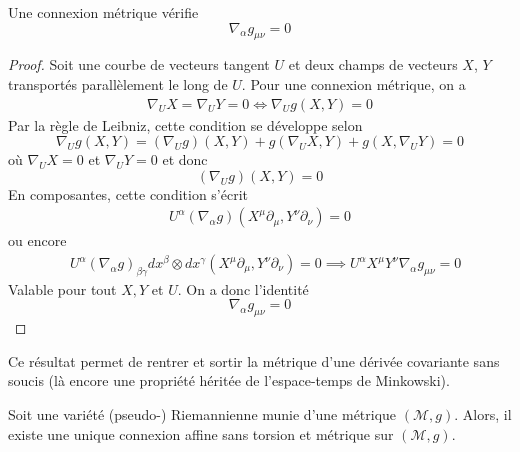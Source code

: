 \begin{theoremframe}
    \begin{lemme}
        Une connexion métrique vérifie
        \begin{equation}
        \label{eq:métrique métrique}
            \nabla_\alpha g_{\mu\nu} = 0
        \end{equation}
    \end{lemme}
\end{theoremframe}
\begin{proof}
    Soit une courbe de vecteurs tangent $U$ et deux champs de vecteurs $X$, $Y$ transportés parallèlement le long de $U$. Pour une connexion métrique, on a
    \begin{align}
        \nabla_U X = \nabla_U Y = 0 \iff \nabla_U g(X,Y) = 0
    \end{align}
    Par la règle de Leibniz, cette condition se développe selon
    \begin{equation}
        \nabla_U g(X, Y) = (\nabla_U g)(X, Y) + g(\nabla_U X, Y) + g(X, \nabla_U Y) = 0
    \end{equation}
    où $\nabla_U X = 0$ et $\nabla_U Y = 0$ et donc
    \begin{equation}
         (\nabla_U g)(X, Y) =0
    \end{equation}
    En composantes, cette condition s'écrit
    \begin{align}
        U^{\alpha}(\nabla_{\alpha}g)(X^{\mu}\partial_{\mu}, Y^{\nu}\partial_{\nu}) = 0
        \label{conexion métrique 1}
    \end{align}
    ou encore
    \begin{align}
        &U^{\alpha}(\nabla_{\alpha}g)_{\beta \gamma} dx^{\beta}\otimes dx^{\gamma}(X^{\mu}\partial_{\mu}, Y^{\nu}\partial_{\nu}) = 0 \implies U^{\alpha}X^{\mu}Y^{\nu}\nabla_{\alpha}g_{\mu \nu} =0
    \end{align}
    Valable pour tout $X,Y$ et $U$. On a donc l'identité
    \begin{equation}
    \nabla_{\alpha}g_{\mu \nu} =0
    \end{equation}
\end{proof}
Ce résultat permet de rentrer et sortir la métrique d'une dérivée covariante sans soucis (là encore une propriété héritée de l'espace-temps de Minkowski).
\begin{theoremframe}
    \begin{theorem}
        \label{thm:fondamental riemannien}
        Soit une variété (pseudo-) Riemannienne munie d'une métrique $(\mathcal{M},g)$. Alors, il existe une unique connexion affine sans torsion et métrique sur $(\mathcal{M},g)$.
    \end{theorem}
\end{theoremframe}  

